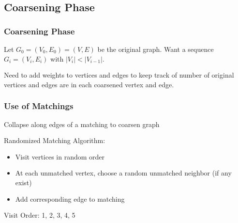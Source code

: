 \documentclass{beamer}
\begin{document}
\subsection{Coarsening Phase}

\begin{frame}
  \frametitle{Coarsening Phase}

  Let $G_0 = (V_0, E_0) = (V,E)$ be the original graph. Want a sequence $G_i = (V_i, E_i)$ with $|V_i| < |V_{i-1}|$.

  \vspace{.5cm}

  Need to add weights to vertices and edges to keep track of number of original vertices and edges are in each coarsened vertex and edge.

\end{frame}

\begin{frame}
  \frametitle{Use of Matchings}

  Collapse along edges of a matching to coarsen graph

  Randomized Matching Algorithm:
  \begin{itemize}
    \item Visit vertices in random order
    \item At each unmatched vertex, choose a random unmatched neighbor (if any exist)
    \item Add corresponding edge to matching
  \end{itemize}

  \begin{center}
  \end{center}

  Visit Order: 1, 2, 3, 4, 5

\end{frame}
\end{document}
